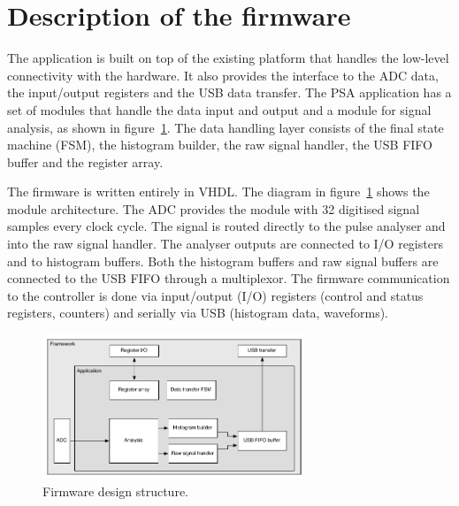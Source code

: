 %
% 



\section{Description of the firmware}
The application is built on top of the existing platform that handles the low-level connectivity with the hardware. It also provides the interface to the ADC data, the input/output registers and the USB data transfer. The PSA application has a set of modules that handle the data input and output and a module for signal analysis, as shown in figure~\ref{fig:application}. 
The data handling layer consists of the final state machine (FSM), the histogram builder, the raw signal handler, the USB FIFO buffer and the register array.

The firmware is written entirely in VHDL. The diagram in figure~\ref{fig:application} shows the module architecture. The ADC provides the module with 32 digitised signal samples every clock cycle. The signal is routed directly to the pulse analyser and into the raw signal handler. The analyser outputs are connected to I/O registers and to histogram buffers. Both the histogram buffers and raw signal buffers are connected to the USB FIFO through a multiplexor. The firmware communication to the controller is done via input/output (I/O) registers (control and status registers, counters) and serially via USB (histogram data, waveforms). 


\begin{figure}[!t]
\centering
\includegraphics[width=0.7\textwidth]{05_current_monitoring/plots/application}
\caption{Firmware design structure.}
\label{fig:application}
\end{figure}


